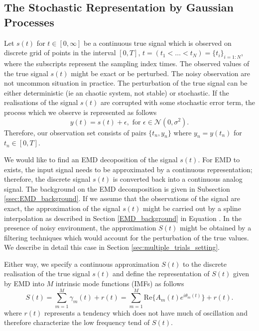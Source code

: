 \subsection{The Stochastic Representation by Gaussian Processes}
Let $s(t)$ for $t\in [0,\infty]$ be a continuous true signal which is observed on discrete grid of points in the interval $[0,T]$, $t =( t_1 < \dots <t_N ) = \{ t_i \}_{i=1:N}$, where the subscripts represent the sampling index times. The observed values of the true signal $s(t)$ might be exact or be perturbed. The noisy observation are not uncommon situation in practice. The perturbation of the true signal can be either deterministic (ie an chaotic system, not stable) or stochastic.  If the realisations of the signal $s(t)$ are corrupted with some stochastic error term, the process which we observe is represented as follows
\begin{equation}\label{eq:signal_noisy_y}
y(t) = s(t) + \epsilon, \text{ for } \epsilon \in \mathcal{N}(0, \sigma^2).
\end{equation}
Therefore, our observation set consists of pairs $\big\{t_n,y_n\big\}$ where $y_n = y(t_n)$ for $t_n \in [0,T]$.

We would like to find an EMD decoposition of the signal $s(t)$. For EMD to exists, the input signal needs to be approximated by a continuous representation; therefore, the discrete signal $s(t)$ is converted back into a continuous analog signal. The background on the EMD decomposition is given in Subsection \ref{ssec:EMD_background}. If we assume that the observations of the signal are exact, the approximation of the signal $s(t)$ might be carried out by a spline interpolation as described in Section \ref{EMD_background} in Equation \label{cubic_spl}. In the presence of noisy environment, the approximation $S(t)$ might be obtained by a filtering techniques which would account for the perturbation of the true values. We describe in detail this case in Section \ref{sec:multiple_trials_setting}.

Either way, we specify a continuous approximation $S(t)$ to the discrete realisation of the true signal $s(t)$ and define the representation of $S(t)$ given by EMD into $M$ intrinsic mode functions (IMFs) as follows
\begin{equation}\label{eq:model_x_EMD}
S(t) = \sum_{m = 1}^M \gamma_m(t) + r(t) = \sum_{m = 1}^M \text{Re}\Big\{ A_m(t)  e^{i \theta_m(t)} \Big\} + r(t).
\end{equation}
where $r(t)$ represents a tendency which does not have much of oscillation and therefore characterize the low frequency tend of $S(t)$.

